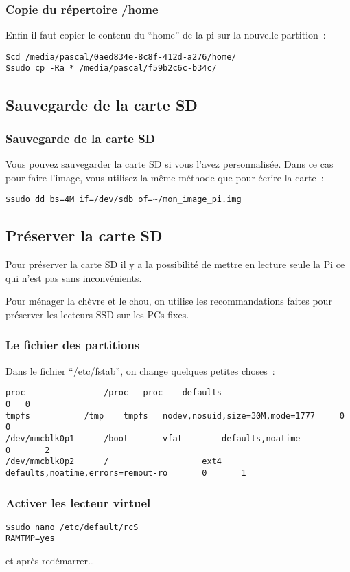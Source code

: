 \begin{frame}[containsverbatim]
\frametitle{Copie du répertoire /home}

Enfin il faut copier le contenu du ``home'' de la pi sur la nouvelle partition~:

\begin{verbatim}
$cd /media/pascal/0aed834e-8c8f-412d-a276/home/
$sudo cp -Ra * /media/pascal/f59b2c6c-b34c/
\end{verbatim}

\end{frame}

\subsection{Sauvegarde de la carte SD}

\begin{frame}[containsverbatim]
\frametitle{Sauvegarde de la carte SD}

Vous pouvez sauvegarder la carte SD si vous l'avez personnalisée. Dans ce cas pour faire l'image, vous utilisez la même méthode que pour écrire la carte~:
\begin{verbatim}
$sudo dd bs=4M if=/dev/sdb of=~/mon_image_pi.img
\end{verbatim}

\end{frame}


\subsection{Préserver la carte SD}

\begin{frame}
Pour préserver la carte SD il y a la possibilité de mettre en lecture seule la Pi ce qui n'est pas sans inconvénients.

Pour ménager la chèvre et le chou, on utilise les recommandations faites pour préserver les lecteurs SSD sur les PCs fixes.

\end{frame}

\begin{frame}[containsverbatim]
\frametitle{Le fichier des partitions}
Dans le fichier ``/etc/fstab'', on change quelques petites choses~:

\begin{verbatim}
proc				/proc	proc 	defaults								0	0
tmpfs			/tmp	tmpfs	nodev,nosuid,size=30M,mode=1777		0	0
/dev/mmcblk0p1  	/boot      	vfat    	defaults,noatime          					0       2
/dev/mmcblk0p2  	/               	ext4    	defaults,noatime,errors=remout-ro 		0       1
\end{verbatim}

\end{frame}

\begin{frame}[containsverbatim]
\frametitle{Activer les lecteur virtuel}

\begin{verbatim}
$sudo nano /etc/default/rcS
RAMTMP=yes
\end{verbatim}

et après redémarrer\dots

\end{frame}